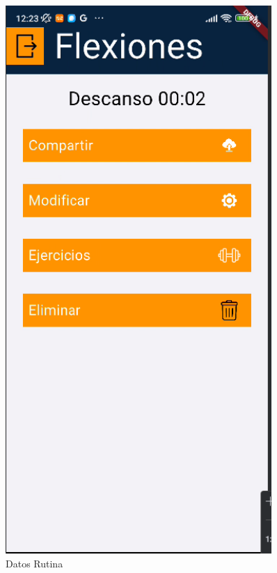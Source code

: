 \begin{figure}[H]
   \centering
   \begin{minipage}{0.35\textwidth}
      \centering
      \includegraphics[width=0.9\textwidth]{pantallas/DatosRutina.png}
      \caption{Datos Rutina}
      \label{fig:DatosRutina}
   \end{minipage}%
   \hspace{0.5cm}
   \begin{minipage}{0.35\textwidth}

\end{minipage}
\end{figure}
